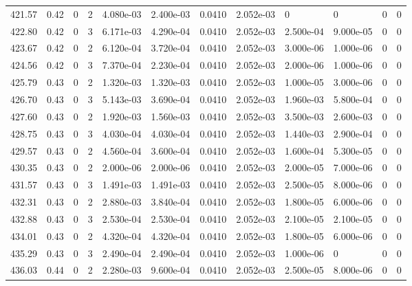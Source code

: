 \documentclass[preview]{standalone}
\begin{document}
{{{{{{{{{{{{{{\begin{tabular}{L{1.2cm}C{1.2cm} C{0.3cm}C{0.5cm} C{1.4cm}C{1.4cm} C{1.4cm}C{1.4cm} C{1.6cm}C{1.6cm} C{1.6cm}C{1.6cm}}
  421.57  &  0.42  & 0     &  2 &  4.080e-03  & 2.400e-03  &  0.0410&   2.052e-03& 0 & 0   &  0 & 0  \\ 
  422.80  &  0.42  & 0     &  3 &  6.171e-03  & 4.290e-04  &  0.0410&   2.052e-03& 2.500e-04 & 9.000e-05   &  0 & 0  \\ 
  423.67  &  0.42  & 0     &  2 &  6.120e-04  & 3.720e-04  &  0.0410&   2.052e-03& 3.000e-06 & 1.000e-06   &  0 & 0  \\ 
  424.56  &  0.42  & 0     &  3 &  7.370e-04  & 2.230e-04  &  0.0410&   2.052e-03& 2.000e-06 & 1.000e-06   &  0 & 0  \\ 
  425.79  &  0.43  & 0     &  2 &  1.320e-03  & 1.320e-03  &  0.0410&   2.052e-03& 1.000e-05 & 3.000e-06   &  0 & 0  \\ 
  426.70  &  0.43  & 0     &  3 &  5.143e-03  & 3.690e-04  &  0.0410&   2.052e-03& 1.960e-03 & 5.800e-04   &  0 & 0  \\ 
  427.60  &  0.43  & 0     &  2 &  1.920e-03  & 1.560e-03  &  0.0410&   2.052e-03& 3.500e-03 & 2.600e-03   &  0 & 0  \\ 
  428.75  &  0.43  & 0     &  3 &  4.030e-04  & 4.030e-04  &  0.0410&   2.052e-03& 1.440e-03 & 2.900e-04   &  0 & 0  \\ 
  429.57  &  0.43  & 0     &  2 &  4.560e-04  & 3.600e-04  &  0.0410&   2.052e-03& 1.600e-04 & 5.300e-05   &  0 & 0  \\ 
  430.35  &  0.43  & 0     &  2 &  2.000e-06  & 2.000e-06  &  0.0410&   2.052e-03& 2.000e-05 & 7.000e-06   &  0 & 0  \\ 
  431.57  &  0.43  & 0     &  3 &  1.491e-03  & 1.491e-03  &  0.0410&   2.052e-03& 2.500e-05 & 8.000e-06   &  0 & 0  \\ 
  432.31  &  0.43  & 0     &  2 &  2.880e-03  & 3.840e-04  &  0.0410&   2.052e-03& 1.800e-05 & 6.000e-06   &  0 & 0  \\ 
  432.88  &  0.43  & 0     &  3 &  2.530e-04  & 2.530e-04  &  0.0410&   2.052e-03& 2.100e-05 & 2.100e-05   &  0 & 0  \\ 
  434.01  &  0.43  & 0     &  2 &  4.320e-04  & 4.320e-04  &  0.0410&   2.052e-03& 1.800e-05 & 6.000e-06   &  0 & 0  \\ 
  435.29  &  0.43  & 0     &  3 &  2.490e-04  & 2.490e-04  &  0.0410&   2.052e-03& 1.000e-06 & 0   &  0 & 0  \\ 
  436.03  &  0.44  & 0     &  2 &  2.280e-03  & 9.600e-04  &  0.0410&   2.052e-03& 2.500e-05 & 8.000e-06   &  0 & 0  \\ 
\hline 
\end{tabular} 

}}}}}}}}}}}}}}
\end{document}
